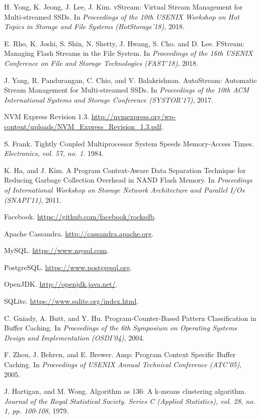 \begin{thebibliography}{00}
H. Yong, K. Jeong, J. Lee, J. Kim.
vStream: Virtual Stream Management for Multi-streamed SSDs.
In \textit{Proceedings of the 10th USENIX Workshop on Hot Topics in Storage
and File Systems (HotStorage'18)}, 2018.

E. Rho, K. Joshi, S. Shin, N. Shetty, J. Hwang, S. Cho. and D. Lee. 
FStream: Managing Flash Streams in the File System.
In \textit{Proceedings of the 16th USENIX Conference on File and Storage Technologies (FAST'18)}, 2018.

J. Yang, R. Pandurangan, C. Chio, and V. Balakrishnan.
AutoStream: Automatic Stream Management for Multi-streamed SSDs.
In \textit{Proceedings of the 10th ACM International Systems and Storage Conference (SYSTOR'17)}, 2017.

NVM Express Revision 1.3.
\url{http://nvmexpress.org/wp-content/uploads/NVM_Express_Revision_1.3.pdf}.

S. Frank.
Tightly Coupled Multiprocessor System Speeds Memory-Access Times.
\textit{Electronics, vol. 57, no. 1}. 1984.

K. Ha, and J. Kim.
A Program Context-Aware Data Separation Technique for Reducing Garbage Collection Overhead in NAND Flash Memory.
In \textit{Proceedings of International Workshop on Storage Network Architecture 
and Parallel I/Os (SNAPI'11)}, 2011.

Facebook. 
\url{https://github.com/facebook/rocksdb}.

Apache Cassandra. 
\url{http://cassandra.apache.org}.

MySQL.
\url{https://www.mysql.com}.

PostgreSQL.
\url{https://www.postgresql.org}.

OpenJDK.
\url{http://openjdk.java.net/}.

SQLite.
\url{https://www.sqlite.org/index.html}.

C. Gniady, A. Butt, and Y. Hu.
Program-Counter-Based Pattern Classification in Buffer Caching.
In \textit{Proceedings of the 6th Symposium on Operating Systems Design and Implementation (OSDI'04)}, 2004.

F. Zhou, J. Behren, and E. Brewer.
Amp: Program Context Specific Buffer Caching.
In \textit{Proceedings of USENIX Annual Technical Conference (ATC'05)}, 2005.

J. Hartigan, and M. Wong.
Algorithm as 136: A k-means clustering algorithm.
\textit{Journal of the Royal Statistical Society. Series C (Applied Statistics),
vol. 28, no. 1, pp. 100-108}, 1979.


\end{thebibliography}
